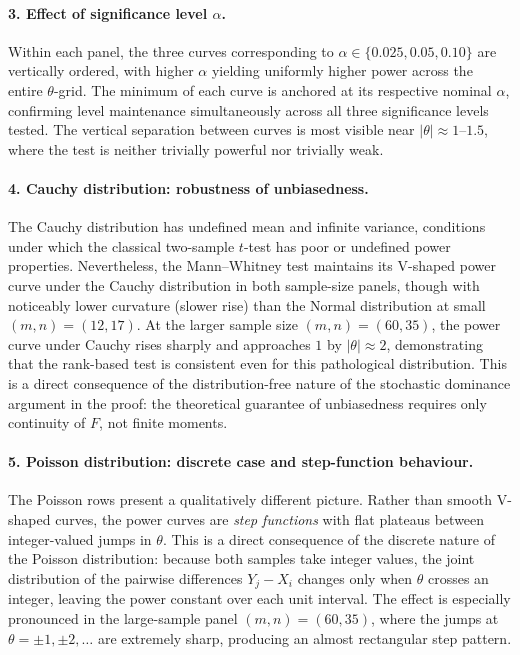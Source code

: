 \documentclass[10pt]{article}
\begin{document}
\paragraph{3.\; Effect of significance level $\alpha$.}
Within each panel, the three curves corresponding to
$\alpha \in \{0.025, 0.05, 0.10\}$ are vertically ordered, with
higher $\alpha$ yielding uniformly higher power across the entire
$\theta$-grid. The minimum of each curve is anchored at its
respective nominal $\alpha$, confirming level maintenance
simultaneously across all three significance levels tested. The
vertical separation between curves is most visible near $|\theta|
\approx 1$--$1.5$, where the test is neither trivially powerful
nor trivially weak.

\paragraph{4.\; Cauchy distribution: robustness of unbiasedness.}
The Cauchy distribution has undefined mean and infinite variance,
conditions under which the classical two-sample $t$-test has poor
or undefined power properties. Nevertheless, the Mann--Whitney
test maintains its V-shaped power curve under the Cauchy
distribution in both sample-size panels, though with noticeably
lower curvature (slower rise) than the Normal distribution at
small $(m,n) = (12,17)$. At the larger sample size $(m,n) = (60,35)$,
the power curve under Cauchy rises sharply and approaches $1$ by
$|\theta| \approx 2$, demonstrating that the rank-based test is
consistent even for this pathological distribution. This is a
direct consequence of the distribution-free nature of the
stochastic dominance argument in the proof: the theoretical
guarantee of unbiasedness requires only continuity of $F$, not
finite moments.

\paragraph{5.\; Poisson distribution: discrete case and step-function
behaviour.}
The Poisson rows present a qualitatively different picture. Rather
than smooth V-shaped curves, the power curves are \emph{step
functions} with flat plateaus between integer-valued jumps in
$\theta$. This is a direct consequence of the discrete nature of
the Poisson distribution: because both samples take integer values,
the joint distribution of the pairwise differences $Y_j - X_i$
changes only when $\theta$ crosses an integer, leaving the
power constant over each unit interval. The effect is especially
pronounced in the large-sample panel $(m,n) = (60,35)$, where the
jumps at $\theta = \pm 1, \pm 2, \ldots$ are extremely sharp,
producing an almost rectangular step pattern.
\end{document}
